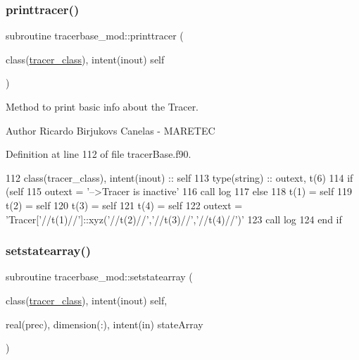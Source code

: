 \subsubsection{\texorpdfstring{printtracer()}{printtracer()}}
{\footnotesize\ttfamily subroutine tracerbase\+\_\+mod\+::printtracer (\begin{DoxyParamCaption}\item[{class(\mbox{\hyperlink{structtracerbase__mod_1_1tracer__class}{tracer\+\_\+class}}), intent(inout)}]{self }\end{DoxyParamCaption})\hspace{0.3cm}{\ttfamily [private]}}



Method to print basic info about the Tracer. 

\begin{DoxyAuthor}{Author}
Ricardo Birjukovs Canelas -\/ M\+A\+R\+E\+T\+EC 
\end{DoxyAuthor}


Definition at line 112 of file tracer\+Base.\+f90.


\begin{DoxyCode}
112     \textcolor{keywordtype}{class}(tracer\_class), \textcolor{keywordtype}{intent(inout)} :: self
113     \textcolor{keywordtype}{type}(string) :: outext, t(6)
114     \textcolor{keywordflow}{if} (self%
115         outext = \textcolor{stringliteral}{'-->Tracer is inactive'}
116         \textcolor{keyword}{call }log%
117     \textcolor{keywordflow}{else}
118         t(1) = self%
119         t(2) = self%
120         t(3) = self%
121         t(4) = self%
122         outext = \textcolor{stringliteral}{'Tracer['}//t(1)//\textcolor{stringliteral}{']::xyz('}//t(2)//\textcolor{stringliteral}{','}//t(3)//\textcolor{stringliteral}{','}//t(4)//\textcolor{stringliteral}{')'}
123         \textcolor{keyword}{call }log%
124 \textcolor{keywordflow}{    end if}
\end{DoxyCode}
\mbox{\label{namespacetracerbase__mod_af85802e927b07e777b94375550246c16}} 
\subsubsection{\texorpdfstring{setstatearray()}{setstatearray()}}
{\footnotesize\ttfamily subroutine tracerbase\+\_\+mod\+::setstatearray (\begin{DoxyParamCaption}\item[{class(\mbox{\hyperlink{structtracerbase__mod_1_1tracer__class}{tracer\+\_\+class}}), intent(inout)}]{self,  }\item[{real(prec), dimension(\+:), intent(in)}]{state\+Array }\end{DoxyParamCaption})\hspace{0.3cm}{\ttfamily [private]}}



